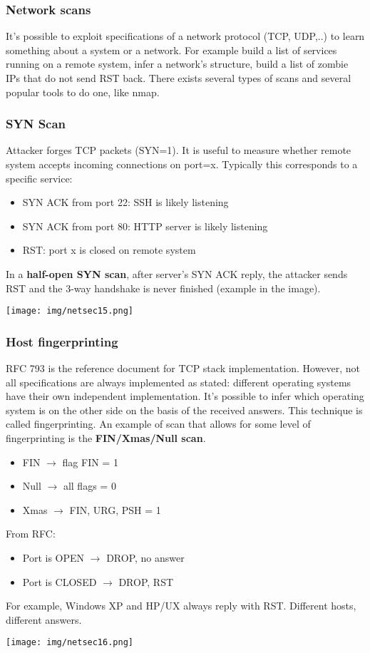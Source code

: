 \documentclass[a4paper, 10pt, titlepage]{article}
\begin{document}
\subsubsection*{Network scans}
It’s possible to exploit specifications of a network protocol (TCP, UDP,..) to learn something about a system or a network. For example build a list of services running on a remote system, infer a network’s structure, build a list of zombie IPs that do not send RST back. 
There exists several types of scans and several popular tools to do one, like nmap.

\subsubsection*{SYN Scan}
Attacker forges TCP packets (SYN=1). It is useful to measure whether remote system accepts incoming connections on port=x. Typically this corresponds to a specific service:
\begin{itemize}
\item SYN ACK from port 22: SSH is likely listening
\item SYN ACK from port 80: HTTP server is likely listening
\item RST: port x is closed on remote system
\end{itemize}
In a \textbf{half-open SYN scan}, after server’s SYN ACK reply, the attacker sends RST and the 3-way handshake is never finished (example in the image).
\begin{center}
	\texttt{[image: img/netsec15.png]}
\end{center}

\subsubsection*{Host fingerprinting}
RFC 793 is the reference document for TCP stack implementation. However, not all specifications are always implemented as stated: different operating systems have their own
independent implementation. It’s possible to infer which operating system is on the other side on the basis of the received answers. This technique is called fingerprinting.
An example of scan that allows for some level of fingerprinting is the \textbf{FIN/Xmas/Null scan}.
\begin{itemize}
	\item FIN $\rightarrow$ flag FIN = 1
	\item Null $\rightarrow$ all flags = 0
	\item Xmas $\rightarrow$ FIN, URG, PSH = 1
\end{itemize}
From RFC:
\begin{itemize}
	\item Port is OPEN $\rightarrow$ DROP, no answer
	\item Port is CLOSED $\rightarrow$ DROP, RST
\end{itemize}
For example, Windows XP and HP/UX always reply with RST. Different hosts, different answers.
\begin{center}
	\texttt{[image: img/netsec16.png]}
\end{center}
\end{document}
